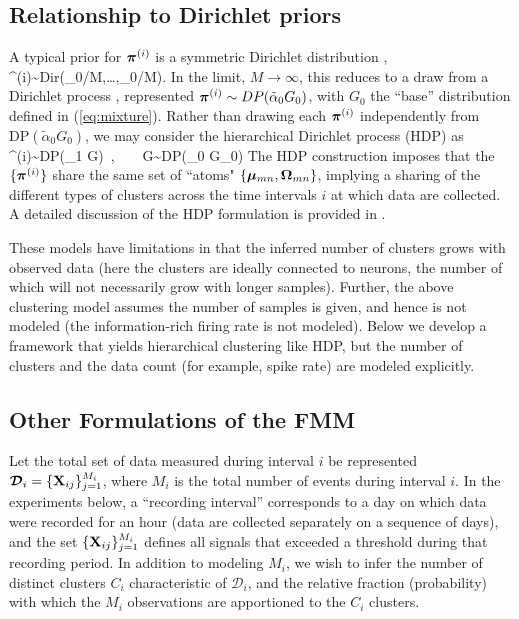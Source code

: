 \documentclass[journal]{IEEEtran}
\begin{document}
\subsection{Relationship to Dirichlet priors} \label{sec:related}



A typical prior for $\boldsymbol{\pi}^{(i)}$ is a symmetric Dirichlet distribution \cite{Dilan},
\beq \piv^{(i)}\sim\mbox{Dir}(\tilde{\alpha}_0/M,\dots,\tilde{\alpha}_0/M).\label{eq:Dir}\eeq
In the limit{,} $M\rightarrow\infty${,} this reduces to a draw from a Dirichlet process \cite{Wood2009,Bo2011}, represented $\boldsymbol{\pi}^{(i)}\sim\relax{DP}(\tilde{\alpha}_0 G_0)$, with $G_0$ the ``base'' distribution defined in (\ref{eq:mixture}). Rather than drawing each $\boldsymbol{\pi}^{(i)}$ independently {from $\mbox{DP}(\tilde{\alpha}_0 G_0)$}, we may consider the hierarchical Dirichlet process (HDP) \cite{HDP} as
\beq \piv^{(i)}\sim\mbox{DP}(\tilde{\alpha}_1 G)~,~~~~G\sim\mbox{DP}(\tilde{\alpha}_0 G_0)\eeq
The HDP construction imposes that the $\{\boldsymbol{\pi}^{(i)}\}$ share the same set of ``atoms" $\{\boldsymbol{\mu}_{mn},\boldsymbol{\Omega}_{mn}\}$, implying
a sharing of the different types of clusters across the time intervals $i$ at which data are collected. A detailed discussion of the HDP formulation is provided in \cite{Bo2011}.

These models have limitations in that the inferred number of clusters grows with observed data (here the clusters are ideally connected to {neurons}, the number of which will not necessarily grow with  {longer samples}). Further, the above clustering model assumes the number of samples is given, and hence is not modeled (the information-rich firing rate is not modeled).
Below we develop a framework that yields hierarchical clustering like HDP, but the number of clusters and the data count (for example, spike rate) are modeled explicitly.

\subsection{Other Formulations of the FMM} %
\label{sub:other_formulations_of_the_fmm}


Let the total set of data measured during interval $i$ be represented $\bm{\mathcal{D}}_i=\{{\mathbf X}_{ij}\}_{j=1}^{M_i}${, where $M_i$ is the total number of events during interval $i$}. In the experiments below, a ``recording interval'' corresponds to a day on which data were recorded for an hour (data are collected separately on a sequence of days), and the set $\{{\mathbf X}_{ij}\}_{j=1}^{M_i}$ defines all signals that exceeded a threshold during that recording period. In addition to modeling $M_i$, we wish to infer the number of distinct clusters $C_i$ characteristic of $\bm{\mathcal{D}}_i$, and the relative fraction (probability) with which the $M_i$ observations are apportioned to the $C_i$ clusters.
\end{document}
